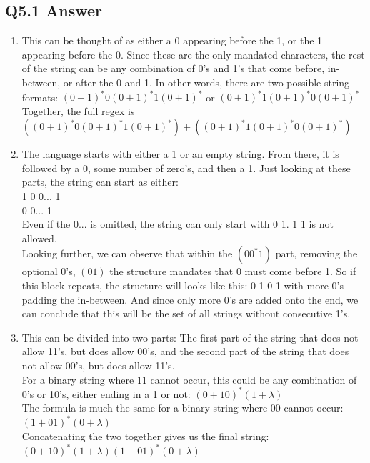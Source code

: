\documentclass{article}
\begin{document}
\subsection*{Q5.1 Answer}
\begin{enumerate}[label=\alph*.]
    \item This can be thought of as either a 0 appearing before the 1, or the 1 appearing before the 0. Since these are the only mandated characters, the rest of the string can be any combination of 0's and 1's that come before, in-between, or after the 0 and 1. In other words, there are two possible string formats: $(0+1)^*0(0+1)^*1(0+1)^*$ or $(0+1)^*1(0+1)^*0(0+1)^*$
    \\ Together, the full regex is $((0+1)^*0(0+1)^*1(0+1)^*)+((0+1)^*1(0+1)^*0(0+1)^*)$
    \item The language starts with either a 1 or an empty string. From there, it is followed by a 0, some number of zero's, and then a 1. Just looking at these parts, the string can start as either:
    \\ 1 0 0... 1 
    \\ 0 0... 1
    \\ Even if the 0... is omitted, the string can only start with 0 1. 1 1 is not allowed.
    \\ Looking further, we can observe that within the $(00^*1)$ part, removing the optional 0's, $(01)$ the structure mandates that 0 must come before 1. So if this block repeats, the structure will looks like this: 0 1 0 1 with more 0's padding the in-between. And since only more 0's are added onto the end, we can conclude that this will be the set of all strings without consecutive 1's.
    \item This can be divided into two parts: The first part of the string that does not allow 11's, but does allow 00's, and the second part of the string that does not allow 00's, but does allow 11's.
    \\ For a binary string where 11 cannot occur, this could be any combination of 0's or 10's, either ending in a 1 or not: $(0+10)^*(1+\lambda)$
    \\ The formula is much the same for a binary string where 00 cannot occur: $(1+01)^*(0+\lambda)$
    \\ Concatenating the two together gives us the final string: $(0+10)^*(1+\lambda)(1+01)^*(0+\lambda)$
\end{enumerate}
\newpage
{}
\end{document}

